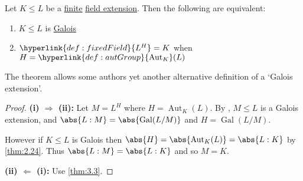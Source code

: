 \documentclass{article}
\DeclareMathOperator{\Aut}{Aut}
\DeclareMathOperator{\Gal}{Gal}
\begin{document}
\begin{nthm}\label{thm:3.4}
    Let $K \leq L$ be a \hyperlink{def:degreeOfFieldExt}{finite} \hyperlink{def:fieldExt}{field extension}. Then the following are equivalent:
    \begin{enumerate}[label=(\roman*)]
        \item $K \leq L$ is \hyperlink{def:galoisExt}{Galois}
        \item $\hyperlink{def:fixedField}{L^H} = K$ when $H = \hyperlink{def:autGroup}{\Aut_K}(L)$
    \end{enumerate}
\end{nthm}

\begin{remark}
    The theorem allows some authors yet another alternative definition of a `Galois extension'.
\end{remark}

\begin{proof}
    \textbf{(i) $\Rightarrow$ (ii):} Let $M = L^H$ where $H = \Aut_K(L)$.
    By , $M \leq L$ is a Galois extension, and $\abs{L:M} = \abs{\Gal(L/M)}$ and $H = \Gal(L/M)$.

    However if $K \leq L$ is Galois then $\abs{H} = \abs{\Aut_K(L)} = \abs{L:K}$ by \cref{thm:2.24}.
    Thus $\abs{L:M} = \abs{L:K}$ and so $M = K$.

    \textbf{(ii) $\Leftarrow$ (i):} Use \cref{thm:3.3}.
\end{proof}
\end{document}
